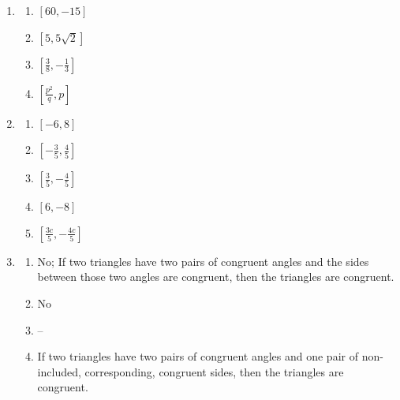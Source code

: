 \documentclass{article}
\begin{document}
\begin{enumerate}
\begin{enumerate}
	\item $(x, y) = (2 - 24t, 1 + 10t)$
	
	\end{enumerate}
	
\item
	\begin{enumerate}
	
	\item $[60, -15]$
	
	\item $[5, 5\sqrt{2}]$
	
	\item $[\frac{3}{8}, -\frac{1}{3}]$
	
	\item $[\frac{p^2}{q}, p]$
	
	\end{enumerate}
	
\item
	\begin{enumerate}
	
	\item $[-6, 8]$
	
	\item $[-\frac{3}{5}, \frac{4}{5}]$
	
	\item $[\frac{3}{5}, -\frac{4}{5}]$
	
	\item $[6, -8]$
	
	\item $[\frac{3c}{5}, -\frac{4c}{5}]$
	
	\end{enumerate}
	
\item
	\begin{enumerate}
	
	\item No; If two triangles have two pairs of congruent angles and the sides between those two angles are congruent, then the triangles are congruent.
	
	\item No
	
	\item --
	
	\item If two triangles have two pairs of congruent angles and one pair of non-included, corresponding, congruent sides, then the triangles are congruent.
	
	\end{enumerate}
	

\end{enumerate}
\end{document}

